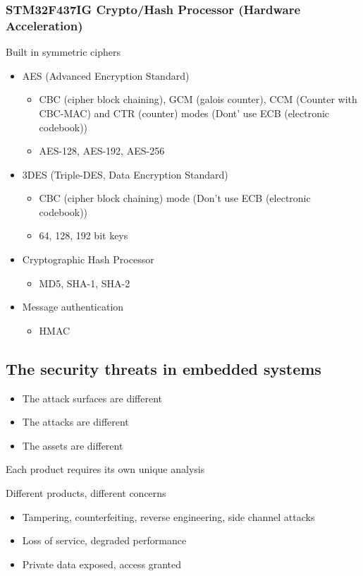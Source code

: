 \subsubsection{STM32F437IG Crypto/Hash Processor (Hardware Acceleration)}
Built in symmetric ciphers
\begin{itemize}
  \item AES (Advanced Encryption Standard)
        \begin{itemize}
          \item CBC (cipher block chaining), GCM (galois counter), CCM (Counter with CBC-MAC) and CTR (counter) modes (Dont' use ECB (electronic codebook))
          \item AES-128, AES-192, AES-256
        \end{itemize}
  \item 3DES (Triple-DES, Data Encryption Standard)
        \begin{itemize}
          \item CBC (cipher block chaining) mode (Don't use ECB (electronic codebook))
          \item 64, 128, 192 bit keys
        \end{itemize}
  \item Cryptographic Hash Processor
        \begin{itemize}
          \item MD5, SHA-1, SHA-2
        \end{itemize}
  \item Message authentication
        \begin{itemize}
          \item HMAC
        \end{itemize}
\end{itemize}

\subsection{The security threats in embedded systems}
\begin{itemize}
  \item The attack surfaces are different
  \item The attacks are different
  \item The assets are different
\end{itemize}

Each product requires its own unique analysis

Different products, different concerns
\begin{itemize}
  \item Tampering, counterfeiting, reverse engineering, side channel attacks
  \item Loss of service, degraded performance
  \item Private data exposed, access granted
\end{itemize}

